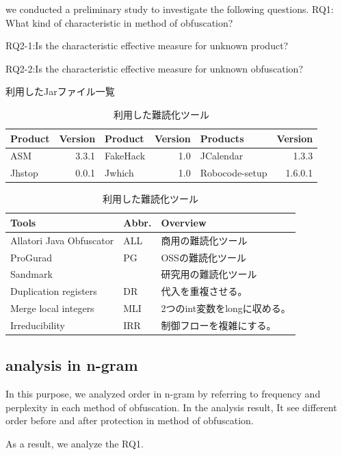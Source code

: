 \documentclass[conference]{IEEEtran}
\begin{document}
we conducted a preliminary study to investigate the following questions.
RQ1: What kind of characteristic in method of obfuscation? 

RQ2-1:Is the characteristic effective measure for unknown product?

RQ2-2:Is the characteristic effective measure for unknown obfuscation?

\begin{table}[t]
  \centering
  \footnotesize{
    \caption{利用したJarファイル一覧}\label{table:jars}
  \begin{tabular}{l|r||l|r||l|r}
    Product & Version & Product & Version & Products & Version \\ \hline
    ASM       & 3.3.1 & FakeHack  & 1.0 &JCalendar & 1.3.3   \\
    Jhstop    & 0.0.1 & Jwhich    & 1.0   & Robocode-setup & 1.6.0.1 
  \end{tabular}
  \caption{利用した難読化ツール}\label{table:tools}
  \begin{tabular}{ll|l}
      Tools & Abbr. & Overview \\ \hline
      Allatori Java Obfuscator & ALL & 商用の難読化ツール \\ \hline
      ProGurad                 & PG & OSSの難読化ツール \\ \hline
      Sandmark                 & & 研究用の難読化ツール \\
      \hspace{0.2cm} Duplication registers & DR & 代入を重複させる。\\
      \hspace{0.2cm} Merge local integers & MLI & 2つのint変数をlongに収める。\\
      \hspace{0.2cm} Irreducibility       & IRR & 制御フローを複雑にする。\\
  \end{tabular}}
\end{table}

\subsection{analysis in n-gram}
In this purpose, we analyzed order in n-gram by referring to frequency and perplexity in each method of obfuscation.
In the analysis result, It see different order before and after protection in method of obfuscation.

As a result, we analyze the RQ1.
\end{document}
